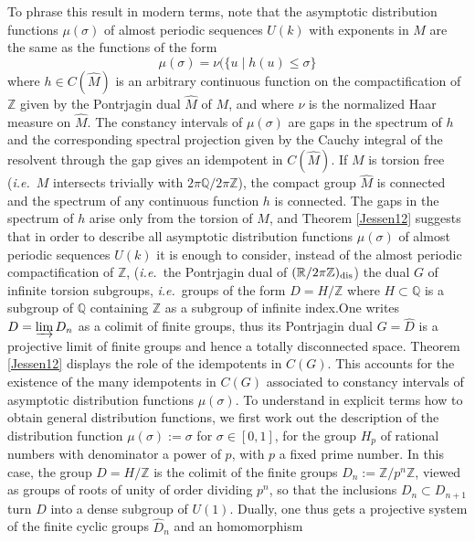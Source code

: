 \documentclass[graybox, envcountsect%
]{svmult}
\def\Q{{\mathbb Q}}
\def\R{{\mathbb R}}
\def\Z{{\mathbb Z}}
\newcommand{\ie}{{\it i.e.\/}\ }
\begin{document}
To phrase this result in modern terms, note that the asymptotic distribution functions $\mu(\sigma)$ of   almost periodic sequences $U(k)$ with exponents in $M$ are the same as the functions of the form 
$$
\mu(\sigma)=\nu(\{u\mid h(u)\leq \sigma\}
$$
where $h\in C(\hat M)$ is an arbitrary continuous function on the compactification of $\Z$ given by the Pontrjagin dual $\hat M$ of $M$, and where $\nu$ is the normalized Haar measure on $\hat M$. The constancy intervals of $\mu(\sigma)$ are gaps in the spectrum of $h$ and the corresponding spectral projection given by the Cauchy integral of the resolvent through the gap gives an idempotent in $C(\hat M)$. 
 If $M$ is torsion free (\ie $M$ intersects trivially with $2\pi\Q/2\pi\Z$), the compact group $\hat M$ is connected and the spectrum of any continuous function  $h$ is connected. \newline 
 The gaps in the spectrum of $h$ arise only from the torsion of $M$, and Theorem \ref{Jessen12} suggests that in order to describe all  asymptotic distribution functions $\mu(\sigma)$ of   almost periodic sequences $U(k)$ it is enough  
  to consider, instead of the almost periodic compactification  of $\Z$, (\ie the Pontrjagin dual of $(\R/2\pi\Z)_{\rm dis}$) the dual $G$ of  infinite torsion subgroups, \ie   groups of the form $D=H/\Z$ where $H\subset \Q$ is a subgroup of $\Q$ containing $\Z$ as a subgroup of infinite index.\newline   One  writes $D=\varinjlim D_n$ as a colimit of finite groups, thus its Pontrjagin dual $G=\hat D$ is a projective limit of finite groups and hence  a totally disconnected space. Theorem \ref{Jessen12} displays the role of  the idempotents in $C(G)$. This accounts for the existence of the many idempotents in $C(G)$ associated to constancy intervals of asymptotic distribution functions $\mu(\sigma)$. \newline
 To understand in explicit terms how to obtain general distribution functions,  we first work out the description of the distribution function $\mu(\sigma):=\sigma$ for $\sigma\in [0,1]$, for the group $H_p$ of rational numbers with denominator a power of $p$, with $p$ a fixed prime number. \newline
 In this case, the group $D=H/\Z$ is the colimit of the finite groups $D_n:=\Z/p^n\Z$, viewed as groups of roots of unity of order dividing $p^n$, so that the inclusions $D_n\subset D_{n+1}$ turn $D$ into a dense subgroup of $U(1)$. Dually, one thus gets a projective system of the finite cyclic groups $\hat D_n$ and an homomorphism 
\end{document}
